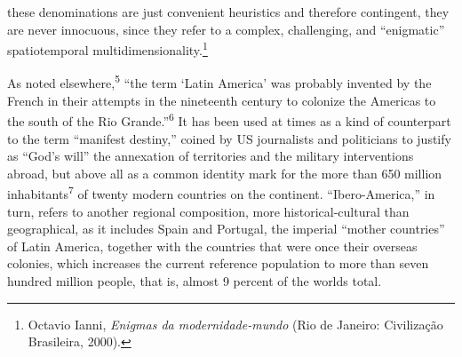 \documentclass{tufte-handout}
\begin{document}
these denominations are just convenient heuristics and therefore
contingent, they are never innocuous, since they refer to a complex,
challenging, and ``enigmatic'' spatiotemporal
multidimensionality.\footnote{Octavio Ianni, \emph{Enigmas da
  modernidade-mundo} (Rio de Janeiro: Civilização Brasileira, 2000).}

As noted elsewhere,\textsuperscript{5} ``the term `Latin
America' was probably invented by the French in their attempts in the
nineteenth century to colonize the Americas to the south of the Rio
Grande.''\textsuperscript{6} It has been used at times as
a kind of counterpart to the term ``manifest destiny,'' coined by US
journalists and politicians to justify as ``God's will'' the annexation
of territories and the military interventions abroad, but above all as a
common identity mark for the more than 650 million
inhabitants\textsuperscript{7} of twenty modern
countries on the continent. ``Ibero-America,'' in turn, refers to
another regional composition, more historical-cultural than
geographical, as it includes Spain and Portugal, the imperial ``mother
countries'' of Latin America, together with the countries that were once
their overseas colonies, which increases the current reference
population to more than seven hundred million people, that is, almost 9
percent of the world\textquotesingle s total.
\end{document}
